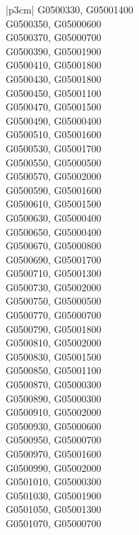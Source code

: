 \begin{customLongTable}{ |p{3cm}| }
G0500330, G05001400 \\ \hline
G0500350, G05000600 \\ \hline
G0500370, G05000700 \\ \hline
G0500390, G05001900 \\ \hline
G0500410, G05001800 \\ \hline
G0500430, G05001800 \\ \hline
G0500450, G05001100 \\ \hline
G0500470, G05001500 \\ \hline
G0500490, G05000400 \\ \hline
G0500510, G05001600 \\ \hline
G0500530, G05001700 \\ \hline
G0500550, G05000500 \\ \hline
G0500570, G05002000 \\ \hline
G0500590, G05001600 \\ \hline
G0500610, G05001500 \\ \hline
G0500630, G05000400 \\ \hline
G0500650, G05000400 \\ \hline
G0500670, G05000800 \\ \hline
G0500690, G05001700 \\ \hline
G0500710, G05001300 \\ \hline
G0500730, G05002000 \\ \hline
G0500750, G05000500 \\ \hline
G0500770, G05000700 \\ \hline
G0500790, G05001800 \\ \hline
G0500810, G05002000 \\ \hline
G0500830, G05001500 \\ \hline
G0500850, G05001100 \\ \hline
G0500870, G05000300 \\ \hline
G0500890, G05000300 \\ \hline
G0500910, G05002000 \\ \hline
G0500930, G05000600 \\ \hline
G0500950, G05000700 \\ \hline
G0500970, G05001600 \\ \hline
G0500990, G05002000 \\ \hline
G0501010, G05000300 \\ \hline
G0501030, G05001900 \\ \hline
G0501050, G05001300 \\ \hline
G0501070, G05000700 \\ \hline

\end{customLongTable}
